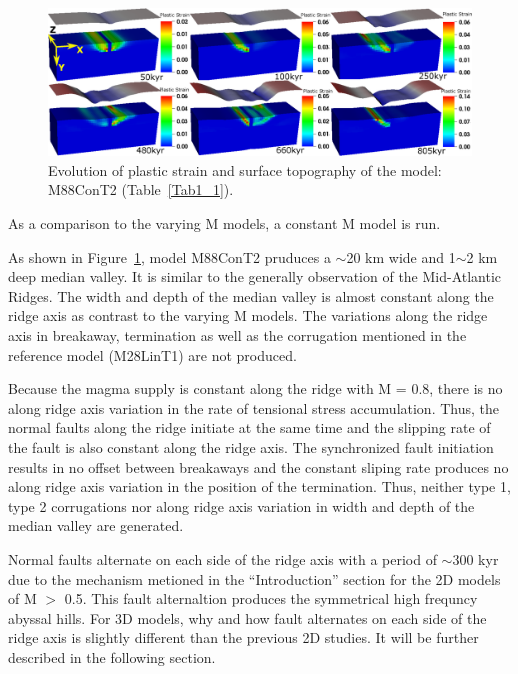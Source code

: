 \begin{figure}[h]
  \centering
    \includegraphics[width=1.0\textwidth]{./Figures/fig_Results1_3.eps}
  \caption{Evolution of plastic strain and surface topography of the model: M88ConT2 (Table~\hyperref[Tab1_1]{\ref{Tab1_1}}).}
 \label{fig_Results1_3}
\end{figure}   

As a comparison to the varying M models, a constant M model is run. 

As shown in Figure~\hyperref[fig_Results1_3]{\ref{fig_Results1_3}}, model M88ConT2 pruduces a $\sim$20 km wide and 1$\sim$2 km deep median valley. It is similar to the generally observation of the Mid-Atlantic Ridges. The width and depth of the median valley is almost constant along the ridge axis as contrast to the varying M models. The variations along the ridge axis in breakaway, termination as well as the corrugation mentioned in the reference model (M28LinT1) are not produced. 

Because the magma supply is constant along the ridge with M = 0.8, there is no along ridge axis variation in the rate of tensional stress accumulation. Thus, the normal faults along the ridge initiate at the same time and the slipping rate of the fault is also constant along the ridge axis. The synchronized fault initiation results in no offset between breakaways and the constant sliping rate produces no along ridge axis variation in the position of the termination. Thus, neither type 1, type 2 corrugations nor along ridge axis variation in width and depth of the median valley are generated.

Normal faults alternate on each side of the ridge axis with a period of $\sim$300 kyr due to the mechanism metioned in the ``Introduction'' section for the 2D models of M $>$ 0.5. This fault alternaltion produces the symmetrical high frequncy abyssal hills. For 3D models, why and how fault alternates on each side of the ridge axis is slightly different than the previous 2D studies. It will be further described in the following section. 

